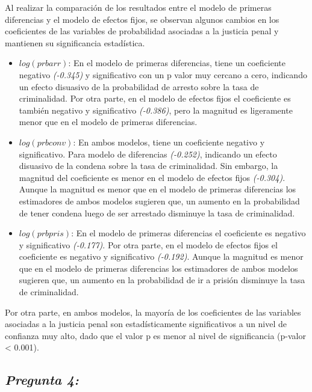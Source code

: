 \documentclass[
  12pt,
]{article}
\begin{document}
Al realizar la comparación de los resultados entre el modelo de primeras
diferencias y el modelo de efectos fijos, se observan algunos cambios en
los coeficientes de las variables de probabilidad asociadas a la
justicia penal y mantienen su significancia estadística.

\begin{itemize}
\item
  \(log(prbarr)\): En el modelo de primeras diferencias, tiene un
  coeficiente negativo \emph{(-0.345)} y significativo con un p valor
  muy cercano a cero, indicando un efecto disuasivo de la probabilidad
  de arresto sobre la tasa de criminalidad. Por otra parte, en el modelo
  de efectos fijos el coeficiente es también negativo y significativo
  \emph{(-0.386)}, pero la magnitud es ligeramente menor que en el
  modelo de primeras diferencias.
\item
  \(log(prbconv)\): En ambos modelos, tiene un coeficiente negativo y
  significativo. Para modelo de diferencias \emph{(-0.252)}, indicando
  un efecto disuasivo de la condena sobre la tasa de criminalidad. Sin
  embargo, la magnitud del coeficiente es menor en el modelo de efectos
  fijos \emph{(-0.304)}. Aunque la magnitud es menor que en el modelo de
  primeras diferencias los estimadores de ambos modelos sugieren que, un
  aumento en la probabilidad de tener condena luego de ser arrestado
  disminuye la tasa de criminalidad.
\item
  \(log(prbpris)\): En el modelo de primeras diferencias el coeficiente
  es negativo y significativo \emph{(-0.177)}. Por otra parte, en el
  modelo de efectos fijos el coeficiente es negativo y significativo
  \emph{(-0.192)}. Aunque la magnitud es menor que en el modelo de
  primeras diferencias los estimadores de ambos modelos sugieren que, un
  aumento en la probabilidad de ir a prisión disminuye la tasa de
  criminalidad.
\end{itemize}

Por otra parte, en ambos modelos, la mayoría de los coeficientes de las
variables asociadas a la justicia penal son estadísticamente
significativos a un nivel de confianza muy alto, dado que el valor p es
menor al nivel de significancia (p-valor \textless{} 0.001).

\subsection{\texorpdfstring{\textbf{\emph{Pregunta
4:}}}{Pregunta 4:}}\label{pregunta-4}
\end{document}

